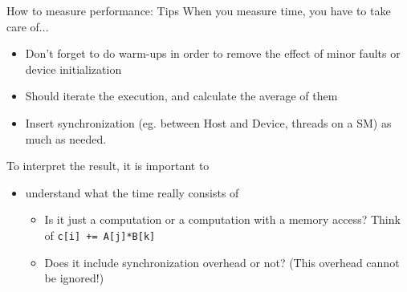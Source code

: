 \documentclass[dvipdfmx, 11pt, aspectratio=169]{beamer}   %
\begin{document}
\begin{frame}[fragile]{How to measure performance: Tips}
When you measure time, you have to take care of...
\begin{itemize}
  \item Don't forget to do warm-ups in order to remove the effect of minor faults or device initialization
  \item Should iterate the execution, and calculate the average of them
  \item Insert synchronization (eg. between Host and Device, threads on a SM) as much as needed.
\end{itemize}
To interpret the result, it is important to
\begin{itemize}
  \item understand what the time really consists of
  \begin{itemize}
    \item Is it just a computation or a computation with a memory access? Think of \lstinline|c[i] += A[j]*B[k]|
    \item Does it include synchronization overhead or not? (This overhead cannot be ignored!)
  \end{itemize}
\end{itemize}
\end{frame}
%
%
%
\end{document}
